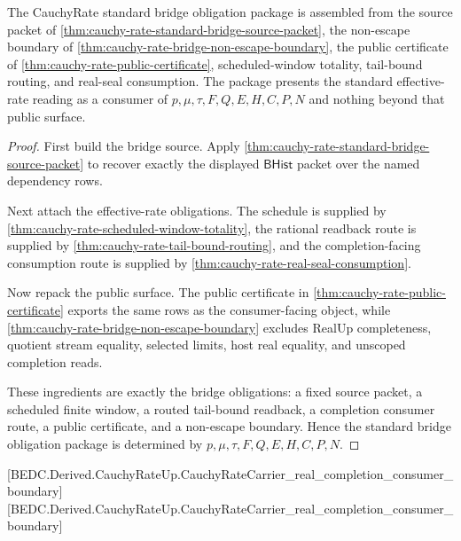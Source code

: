 \begin{theorem}
\label{thm:cauchy-rate-standard-bridge-obligation-package}
The CauchyRate standard bridge obligation package is assembled from the source packet of \autoref{thm:cauchy-rate-standard-bridge-source-packet}, the non-escape boundary of \autoref{thm:cauchy-rate-bridge-non-escape-boundary}, the public certificate of \autoref{thm:cauchy-rate-public-certificate}, scheduled-window totality, tail-bound routing, and real-seal consumption. The package presents the standard effective-rate reading as a consumer of $p,\mu,\tau,F,Q,E,H,C,P,N$ and nothing beyond that public surface.
\end{theorem}
\begin{proof}
First build the bridge source. Apply \autoref{thm:cauchy-rate-standard-bridge-source-packet} to recover exactly the displayed $\mathsf{BHist}$ packet over the named dependency rows.

Next attach the effective-rate obligations. The schedule is supplied by \autoref{thm:cauchy-rate-scheduled-window-totality}, the rational readback route is supplied by \autoref{thm:cauchy-rate-tail-bound-routing}, and the completion-facing consumption route is supplied by \autoref{thm:cauchy-rate-real-seal-consumption}.

Now repack the public surface. The public certificate in \autoref{thm:cauchy-rate-public-certificate} exports the same rows as the consumer-facing object, while \autoref{thm:cauchy-rate-bridge-non-escape-boundary} excludes RealUp completeness, quotient stream equality, selected limits, host real equality, and unscoped completion reads.

These ingredients are exactly the bridge obligations: a fixed source packet, a scheduled finite window, a routed tail-bound readback, a completion consumer route, a public certificate, and a non-escape boundary. Hence the standard bridge obligation package is determined by $p,\mu,\tau,F,Q,E,H,C,P,N$.
\end{proof}

[BEDC.Derived.CauchyRateUp.CauchyRateCarrier\_real\_completion\_consumer\_boundary]
[BEDC.Derived.CauchyRateUp.CauchyRateCarrier\_real\_completion\_consumer\_boundary]

